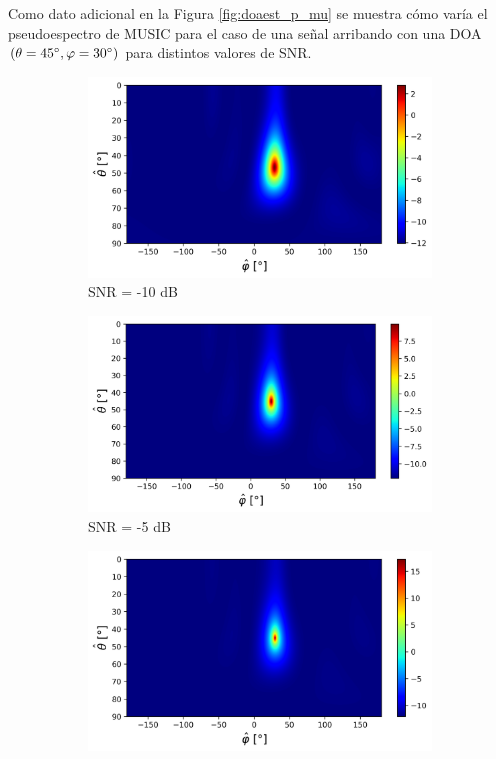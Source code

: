 Como dato adicional en la Figura \ref{fig:doaest_p_mu} se muestra cómo varía el pseudoespectro de MUSIC para el caso de una señal arribando con una DOA $(\theta = 45^{\circ}, \varphi=30^{\circ})$ para distintos valores de SNR.
\begin{figure}[ht!]
    \centering
    \begin{subfigure}[b]{0.49\textwidth}
        \centering
        \includegraphics[width=\linewidth]{images/03-DOAEst/p_mu_-10.png}
        \caption{SNR = -10 dB}
    \end{subfigure}
    \hfill
    \begin{subfigure}[b]{0.49\textwidth}
        \centering
        \includegraphics[width=\linewidth]{images/03-DOAEst/p_mu_-5.png}
        \caption{SNR = -5 dB}
    \end{subfigure}
    \hfill
    \begin{subfigure}[b]{0.49\textwidth}
        \centering
        \includegraphics[width=\linewidth]{images/03-DOAEst/p_mu_0.png}

\end{subfigure}
\end{figure}
